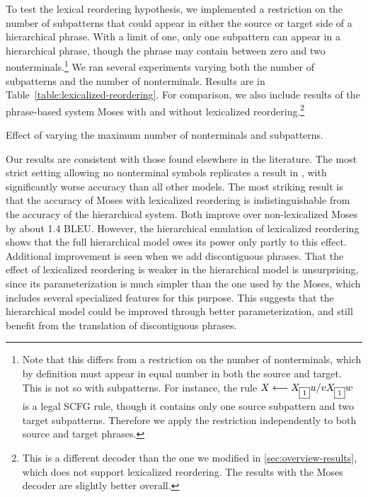 To test the lexical reordering hypothesis, we implemented a
restriction on the number of subpatterns that could appear in either
the source or target side of a hierarchical phrase.  With a limit
of one, only one subpattern can appear in a hierarchical phrase, though
the phrase may contain between zero and two nonterminals.\footnote{
Note that this differs from a restriction on the number of 
nonterminals, which by definition must appear in equal number in both
the source and target.  This is not so with subpatterns.  For instance,
the rule $X \longleftarrow \cidx{X}{1}u / v\cidx{X}{1}w$ is a legal 
SCFG rule, though it contains only one source subpattern 
and two target subpatterns.  Therefore we apply
the restriction independently to both source and target phrases.}
We ran several
experiments varying both the number of subpatterns and the
number of nonterminals.  Results are in 
Table~\ref{table:lexicalized-reordering}.
For comparison, we also include results of the
phrase-based system Moses \citep{Koehn:2007:acl-demo} with and
without lexicalized reordering.\footnote{This is a different
decoder than the one we modified in \textsection\ref{sec:overview-results},
which does not support lexicalized reordering.  The results with
the Moses decoder are slightly better overall.}

\figpreamble
\begin{table}
	\figfontsize{
	\begin{center}
		
	\end{center}}
	\figpostamble
	\caption{Effect of varying the maximum number of nonterminals and subpatterns.}
		\label{table:lexicalized-reordering}
\end{table}

Our results are consistent with those found
elsewhere in the literature.  The most strict setting
allowing no nonterminal symbols replicates a result in 
\citet[Table~7]{Chiang:2007:cl}, with
significantly worse accuracy than all other models.
The most striking result is that the accuracy of Moses
with lexicalized reordering is indistinguishable from the accuracy
of the hierarchical system.  Both improve over non-lexicalized
Moses by about 1.4 BLEU.  However, the
hierarchical emulation of lexicalized reordering shows that
the full hierarchical model owes its power only partly to
this effect.  Additional improvement is seen when we add
discontiguous phrases.  That the effect of lexicalized reordering is
weaker in the hierarchical model is unsurprising, since its
parameterization is much simpler than the one used by the
Moses, which includes several specialized features for this
purpose.  This suggests that the hierarchical model could
be improved through better parameterization, and still
benefit from the translation of discontiguous phrases.

